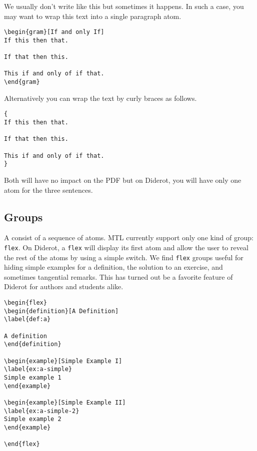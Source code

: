 We usually don't write like this but sometimes it happens.
%
In such a case, you may want to wrap this text into a single paragraph atom.
%
\begin{lstlisting}
\begin{gram}[If and only If]
If this then that.

If that then this.

This if and only of if that.
\end{gram}
\end{lstlisting}
%
Alternatively you can wrap the text by curly braces as follows.
%
\begin{lstlisting}
{
If this then that.

If that then this.

This if and only of if that.
}
\end{lstlisting}
%
%
Both will have no impact on the PDF but on Diderot, you will have only one atom for the three sentences.


\subsection{Groups}
\label{sec:mtl::groups}

\begin{gram}[Group]
A  consist of a sequence of atoms.  MTL currently support only one kind of group: \lstinline`flex`.  On Diderot, a \lstinline`flex` will display its first atom and allow the user to reveal the rest of the atoms by using a simple switch.  We find \lstinline`flex` groups useful for hiding simple examples for a definition, the solution to an exercise, and sometimes tangential remarks.  This has turned out be a favorite feature of Diderot for authors and students alike. 

\begin{lstlisting}
\begin{flex}
\begin{definition}[A Definition]
\label{def:a}

A definition
\end{definition}

\begin{example}[Simple Example I]
\label{ex:a-simple}
Simple example 1
\end{example}

\begin{example}[Simple Example II]
\label{ex:a-simple-2}
Simple example 2
\end{example}

\end{flex}
\end{lstlisting}
\end{gram}

